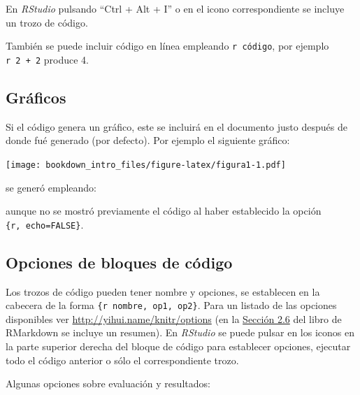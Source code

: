 \documentclass[]{book}
\newenvironment{Shaded}{\begin{snugshade}}{\end{snugshade}}
\newcommand{\NormalTok}[1]{#1}
\theoremstyle{definition}
\theoremstyle{definition}
\theoremstyle{definition}
\theoremstyle{remark}
\begin{document}
En \emph{RStudio} pulsando ``Ctrl + Alt + I'' o en el icono
correspondiente se incluye un trozo de código.

También se puede incluir código en línea empleando
\texttt{\textasciigrave{}r\ código\textasciigrave{}}, por ejemplo
\texttt{\textasciigrave{}r\ 2\ +\ 2\textasciigrave{}} produce 4.

\subsection{Gráficos}\label{graficos}

Si el código genera un gráfico, este se incluirá en el documento justo
después de donde fué generado (por defecto). Por ejemplo el siguiente
gráfico:

\texttt{[image: bookdown\_intro\_files/figure-latex/figura1-1.pdf]}

se generó empleando:

\begin{Shaded}
\end{Shaded}

aunque no se mostró previamente el código al haber establecido la opción
\texttt{\textasciigrave{}\textasciigrave{}\textasciigrave{}\{r,\ echo=FALSE\}}.

\subsection{Opciones de bloques de código}\label{opcodigo}

Los trozos de código pueden tener nombre y opciones, se establecen en la
cabecera de la forma
\texttt{\textasciigrave{}\textasciigrave{}\textasciigrave{}\{r\ nombre,\ op1,\ op2\}}.
Para un listado de las opciones disponibles ver
\url{http://yihui.name/knitr/options} (en la
\href{https://bookdown.org/yihui/rmarkdown/r-code.html}{Sección 2.6} del
libro de RMarkdown se incluye un resumen). En \emph{RStudio} se puede
pulsar en los iconos en la parte superior derecha del bloque de código
para establecer opciones, ejecutar todo el código anterior o sólo el
correspondiente trozo.

Algunas opciones sobre evaluación y resultados:
\end{document}
